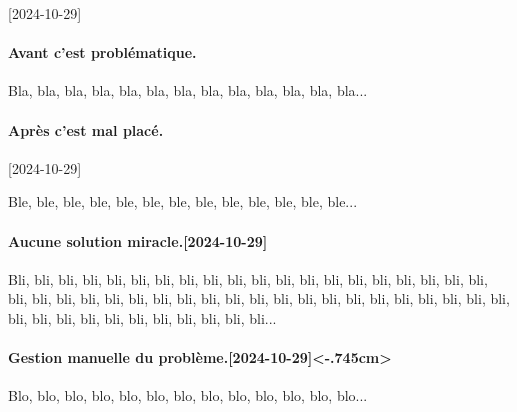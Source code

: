 [2024-10-29]%
\paragraph{Avant c'est problématique.}
Bla, bla, bla, bla, bla, bla, bla, bla, bla, bla, bla, bla, bla...


\paragraph{Après c'est mal placé.}%
[2024-10-29]

Ble, ble, ble, ble, ble, ble, ble, ble, ble, ble, ble, ble, ble...


\paragraph{Aucune solution miracle.[2024-10-29]}

Bli, bli, bli, bli, bli, bli, bli, bli, bli, bli, bli, bli, bli,
bli, bli, bli, bli, bli, bli, bli, bli, bli, bli, bli, bli, bli,
bli, bli, bli, bli, bli, bli, bli, bli, bli, bli, bli, bli, bli,
bli, bli, bli, bli, bli, bli, bli, bli, bli, bli, bli, bli, bli...


\paragraph{Gestion manuelle du problème.[2024-10-29]<-.745cm>}

Blo, blo, blo, blo, blo, blo, blo, blo, blo, blo, blo, blo, blo...
